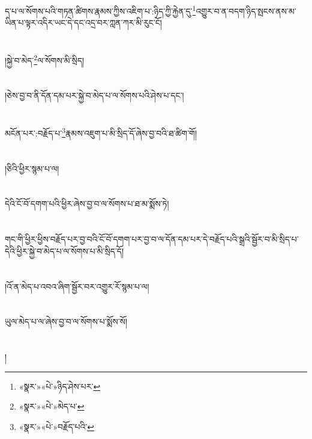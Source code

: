ད་པ་ལ་སོགས་པའི་གཏན་ཚིགས་རྣམས་ཀྱིས་འཇིག་པ་:ཉིད་ཀྱི་རྐྱེན་དུ་\footnote{«སྣར་»«པེ་»ཉིད་ཤེས་པར་}འགྱུར་བ་ན་བདག་ཉིད་སྤངས་ནས་མ་ཡིན་པ་ལྟར་འདིར་ཡང་དེ་དང་འདྲ་བར་ཀླན་ཀར་མི་རུང་ངོ།\chapter{ }།སྐྱེ་བ་མེད་\footnote{«སྣར་»«པེ་»མེད་པ་}ལ་སོགས་མི་སྲིད།\chapter{ }།ཅེས་བྱ་བ་ནི་དོན་དམ་པར་སྐྱེ་བ་མེད་པ་ལ་སོགས་པའི་ཤེས་པ་དང་།\chapter{ }མངོན་པར་:བརྗོད་པ་\footnote{«སྣར་»«པེ་»བརྗོད་པའི་}རྣམས་འཇུག་པ་མི་སྲིད་དོ་ཞེས་བྱ་བའི་ཐ་ཚིག་གོ།\chapter{ }།ཅིའི་ཕྱིར་སྙམ་པ་ལ།\chapter{ }དེའི་ངོ་བོ་དགག་པའི་ཕྱིར་ཞེས་བྱ་བ་ལ་སོགས་པ་ཐ་མ་སྨོས་ཏེ།\chapter{ }གང་གི་ཕྱིར་ཕྱིས་བརྗོད་པར་བྱ་བའི་ངོ་བོ་དགག་པར་བྱ་བ་ལ་དོན་དམ་པར་དེ་བརྗོད་པའི་སྒྲའི་སྦྱོར་བ་མི་སྲིད་པ་དེའི་ཕྱིར་སྐྱེ་བ་མེད་པ་ལ་སོགས་པ་མི་སྲིད་དོ།\chapter{ }།འོ་ན་མེད་པ་འབའ་ཞིག་སྦྱོར་བར་འགྱུར་རོ་སྙམ་པ་ལ།\chapter{ }ཡུལ་མེད་པ་ལ་ཞེས་བྱ་བ་ལ་སོགས་པ་སྨོས་སོ།\chapter{ }།
